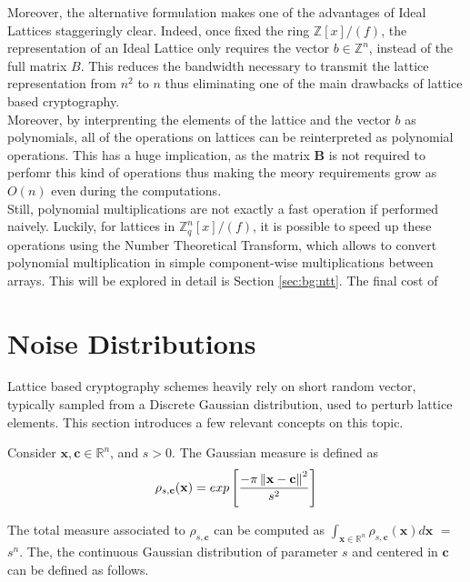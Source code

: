Moreover, the alternative formulation makes one of the advantages of Ideal Lattices staggeringly clear. Indeed, once fixed the ring $\mathbb{Z}[x]/(f)$, the representation of an Ideal Lattice only requires the vector $b\in\mathbb{Z}^n$, instead of the full matrix $B$. This reduces the bandwidth necessary to transmit the lattice representation from $n^2$ to $n$ thus eliminating one of the main drawbacks of lattice based cryptography.\\
Moreover, by interprenting the elements of the lattice and the vector $b$ as polynomials, all of the operations on lattices can be reinterpreted as polynomial operations. This has a huge implication, as the matrix $\mathbf{B}$ is not required to perfomr this kind of operations thus making the meory requirements grow as $O(n)$ even during the computations.\\
Still, polynomial multiplications are not exactly a fast operation if performed naively. Luckily, for lattices in $\mathbb{Z}_q^n[x]/(f)$, it is possible to speed up these operations using the Number Theoretical Transform, which allows to convert polynomial multiplication in simple component-wise multiplications between arrays. This will be explored in detail is Section \ref{sec:bg:ntt}. The final cost of 

\section{Noise Distributions}
Lattice based cryptography schemes heavily rely on short random vector, typically sampled from a Discrete Gaussian distribution, used to perturb lattice elements. This section introduces a few relevant concepts on this topic.\\

\begin{definition}
Consider $\mathbf{x},\mathbf{c}\in\mathbb{R}^n$, and $s>0$. The Gaussian measure is defined as
\begin{equation*}
\rho_{s,\mathbf{c}}(\mathbf{x}) = exp\left[\frac{-\pi\left\lVert \mathbf{x}-\mathbf{c} \right\rVert^2}{s^2}\right]
\end{equation*}
\end{definition}

The total measure associated to $\rho_{s,\mathbf{c}}$ can be computed as $\int_{\mathbf{x}\in\mathbb{R}^n}\rho_{s,\mathbf{c}}(\mathbf{x})d\mathbf{x}$ $=$ $s^n$. The, the continuous Gaussian distribution of parameter $s$ and centered in $\mathbf{c}$ can be defined as follows.

